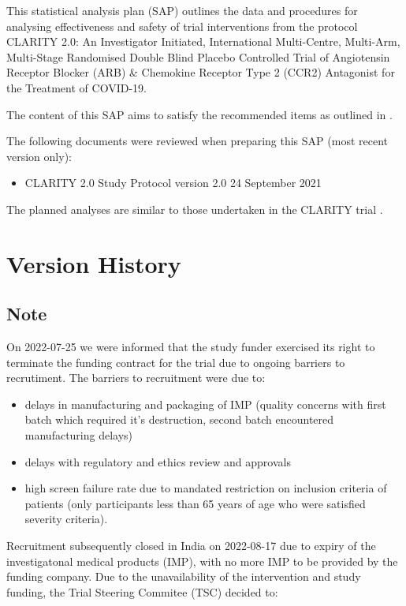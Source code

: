 \documentclass[11pt,parskip=half-]{scrartcl}
\begin{document}
This statistical analysis plan (SAP) outlines the data and procedures for analysing effectiveness and safety of trial interventions from the protocol CLARITY 2.0: An Investigator Initiated, International Multi-Centre, Multi-Arm, Multi-Stage Randomised Double Blind Placebo Controlled Trial of Angiotensin Receptor Blocker (ARB) \& Chemokine Receptor Type 2 (CCR2) Antagonist for the Treatment of COVID-19.

The content of this SAP aims to satisfy the recommended items as outlined in \cite{gamble2017}.

The following documents were reviewed when preparing this SAP (most recent version only):

\begin{itemize}
    \item CLARITY 2.0 Study Protocol version 2.0 24 September 2021
\end{itemize}


The planned analyses are similar to those undertaken in the CLARITY trial \cite{hockham2021protocol, mcgree2021controlled}.

\section*{Version History}

\subsection*{Note}

On 2022-07-25 we were informed that the study funder exercised its right to terminate the funding contract for the trial due to ongoing barriers to recrutiment. The barriers to recruitment were due to:
\begin{itemize}
    \item delays in manufacturing and packaging of IMP (quality concerns with first batch which required it's destruction, second batch encountered manufacturing delays)
    \item delays with regulatory and ethics review and approvals
    \item high screen failure rate due to mandated restriction on inclusion criteria of patients (only participants less than 65 years of age who were satisfied severity criteria).
\end{itemize}

Recruitment subsequently closed in India on 2022-08-17 due to expiry of the investigatonal medical products (IMP), with no more IMP to be provided by the funding company. Due to the unavailability of the intervention and study funding, the Trial Steering Commitee (TSC) decided to:
\end{document}
